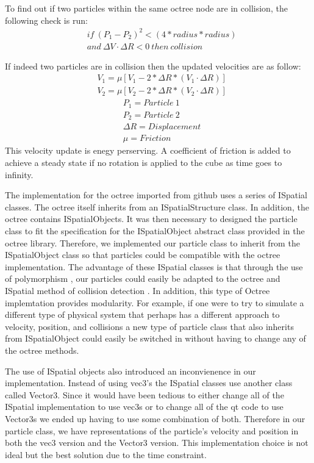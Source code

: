 To find out if two particles within the same octree node are in collision, the following check is run:
\begin{align*}
  & if \: (P_1 - P_2)^2 < (4*radius*radius) \\
  & and \: \Delta V \cdot \Delta R < 0 \: then \: collision
\end{align*}

If indeed two particles are in collision then the updated velocities are as follow:
\begin{align*}
  &  V_1 = \mu [V_1 - 2*\Delta R*(V_1\cdot \Delta R)] \\
  &  V_2 = \mu [V_2 - 2*\Delta R*(V_2\cdot \Delta R)] 
\end{align*}
\begin{align*}
  & P_1= Particle \:1 \\
  & P_2= Particle \:2 \\
  & \Delta R =Displacement \\
  & \mu = Friction
\end{align*}
This velocity update is enegy perserving. A coefficient of friction is added to achieve a 
steady state if no rotation is applied to the cube as time goes to infinity. 

The implementation for the octree imported from github uses a series of ISpatial classes. 
The octree itself inherits from an ISpatialStructure class.  In addition, the octree contains
ISpatialObjects.  It was then necessary to designed the particle class to fit the specification 
for the ISpatialObject abstract class provided in the octree library.
 \cite{octree} Therefore, we implemented our 
particle class to inherit from the ISpatialObject class so that particles could be compatible 
with the octree implementation. The advantage of these ISpatial classes is that through 
the use of polymorphism
, our particles could easily be adapted to the octree and ISpatial method of collision detection
.  In addition, this type of Octree implemtation provides modularity.  For example, if one were to
try to simulate a different type of physical system that perhaps has a different approach to
velocity, position, and collisions a new type of particle class that also inherits from 
ISpatialObject could easily be switched in without having to change any of the octree methods. 


The use of ISpatial objects also introduced an inconvienence in our implementation.
Instead of using vec3's the ISpatial classes use another class called Vector3.  Since it would
have been tedious to either change all of the ISpatial implementation to use vec3s or to change
all of the qt code to use Vector3s we ended up having to use some combination of both.  
Therefore in our particle class, we have representations of the particle's velocity and
position in both the vec3 version and the Vector3 version.  This implementation choice is
not ideal but the best solution due to the time constraint.

